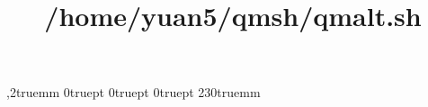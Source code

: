 \newcommand{\hlstd}[1]{\textcolor[rgb]{0,0,0}{#1}}
\newcommand{\hlkey}[1]{\textcolor[rgb]{0.7,0.41,0.09}{#1}}
\newcommand{\hlnum}[1]{\textcolor[rgb]{1,0,0}{#1}}
\newcommand{\hltyp}[1]{\textcolor[rgb]{0,1,0}{#1}}
\newcommand{\hlesc}[1]{\textcolor[rgb]{1,0.13,1}{#1}}
\newcommand{\hlstr}[1]{\textcolor[rgb]{1,0,0}{#1}}
\newcommand{\hldstr}[1]{\textcolor[rgb]{1,0,0}{#1}}
\newcommand{\hlcom}[1]{\textcolor[rgb]{0,0,1}{#1}}
\newcommand{\hldir}[1]{\textcolor[rgb]{1,0.13,1}{#1}}
\newcommand{\hlsym}[1]{\textcolor[rgb]{0,0,0}{#1}}
\newcommand{\hlline}[1]{\textcolor[rgb]{0,0,1}{#1}}

\title{/home/yuan5/qmsh/qmalt.sh}
\oddsidemargin -3mm
,2truemm
\topmargin 0truept
\headheight 0truept
\headsep 0truept
\textheight 230truemm

\noindent
\ttfamily
